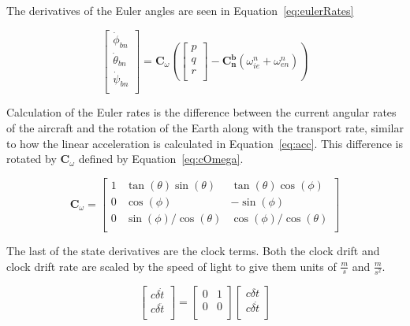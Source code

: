 The derivatives of the Euler angles are seen in Equation~\ref{eq:eulerRates}

\begin{equation}\label{eq:eulerRates}
    \begin{bmatrix}
        \dot{\phi}_{bn}   \\
        \dot{\theta}_{bn} \\
        \dot{\psi}_{bn}   \\
    \end{bmatrix} =
    \mathbf{C}_{\omega}
    \left(
    \begin{bmatrix}
            p \\
            q \\
            r \\
        \end{bmatrix} -
    \mathbf{C_n^b}\left(\omega_{ie}^n + \omega_{en}^n\right)
    \right)
\end{equation}

Calculation of the Euler rates is the difference between the current angular rates of the aircraft and the rotation of the Earth along with the transport rate, similar to how the linear acceleration is calculated in Equation~\ref{eq:acc}. This difference is rotated by \(\mathbf{C}_{\omega}\) defined by Equation~\ref{eq:cOmega}.

\begin{equation}\label{eq:cOmega}
    \mathbf{C}_{\omega} =
    \begin{bmatrix}
        1 & \tan(\theta)\sin(\theta)    & \tan(\theta)\cos(\phi)      \\
        0 & \cos(\phi)                  & -\sin(\phi)                 \\
        0 & {\sin(\phi)}/{\cos(\theta)} & {\cos(\phi)}/{\cos(\theta)} \\
    \end{bmatrix}
\end{equation}

The last of the state derivatives are the clock terms. Both the clock drift and clock drift rate are scaled by the speed of light to give them units of \(\frac{m}{s}\) and \(\frac{m}{s^2}\).

\begin{equation}\label{eq:clkRates}
    \begin{bmatrix}
        c\delta \dot{t} \\
        c\delta\ddot{t} \\
    \end{bmatrix} =
    \begin{bmatrix}
        0 & 1 \\
        0 & 0 \\
    \end{bmatrix}
    \begin{bmatrix}
        c\delta {t}    \\
        c\delta\dot{t} \\
    \end{bmatrix}
\end{equation}

